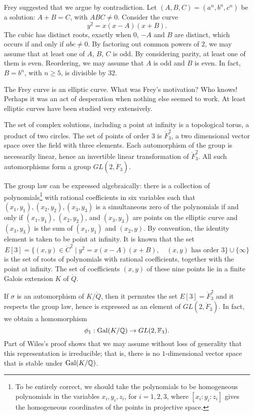 \documentclass{amsart}
\def\CC{\ring{C}}
\def\oG{\op{Gal}}
\begin{document}
Frey suggested that we argue by contradiction.  Let
$(A,B,C)=(a^n,b^n,c^n)$ be a solution: $A+B=C$, with $ABC\ne
0$. Consider the curve
\[
y^2 = x (x - A) (x + B).
\]
The cubic has distinct roots, exactly when $0$, $-A$ and $B$ are
distinct, which occurs if and only if $abc\ne 0$.  By factoring out
common powers of $2$, we may assume that at least one of $A$, $B$, $C$
is odd.  By considering parity, at least one of them is even.
Reordering, we may assume that $A$ is odd and $B$ is even.  In fact,
$B=b^n$, with $n\ge 5$, is divisible by $32$.


The Frey curve is an elliptic curve.  What was Frey's motivation?  Who
knows! Perhaps it was an act of desperation when nothing else seemed
to work. At least elliptic curves have been studied very extensively.

The set of complex solutions, including a point at infinity is a
topological torus, a product of two circles.  The set of points of
order $3$ is $\ring{F}_3^2$, a two dimensional vector space over the
field with three elements.  Each automorphism of the group is
necessarily linear, hence an invertible linear transformation of
$\ring{F}^2_3$.  All such automorphisms form a group
$GL(2,\ring{F}_3)$.

The group law can be expressed algebraically: there is a collection of
polynomials\footnote{To be entirely correct, we should take the
  polynomials to be homogeneous polynomials in the variables
  $x_i,y_i,z_i$, for $i=1,2,3$, where $[x_i:y_i:z_i]$ gives the
  homogeneous coordinates of the points in projective space.}  with
rational coefficients in six variables such that
$(x_1,y_1),(x_2,y_2),(x_3,y_3)$ is a simultaneous zero of the
polynomials if and only if $(x_1,y_1)$, $(x_2,y_2)$, and $(x_3,y_3)$
are points on the elliptic curve and $(x_3,y_3)$ is the sum of
$(x_1,y_1)$ and $(x_2,y)$.  By convention, the identity element is
taken to be point at infinity.  It is known that the set
\[
E[3]= \{(x,y) \in \CC^2\mid y^2 = x (x-A) (x+B), 
\quad (x,y) \text{ has order } 3\}\cup \{\infty\}
\]
is the set of roots of polynomials with rational coefficients,
together with the point at infinity.  The set of coefficients $(x,y)$
of these nine points lie in a finite Galois extension $K$ of
$\ring{Q}$.

If $\sigma$ is an automorphism of $K/\ring{Q}$, then it permutes the
set $E[3]=\ring{F}_3^2$ and it respects the group law, hence is
expressed as an element of $GL(2,\ring{F}_3)$.  In fact, we obtain a
homomorphism
\[
\phi_1 : \oG(K/\ring{Q}) \to GL(2,\ring{F}_3).
\]
Part of Wiles's proof shows that we may assume without loss of
generality that this representation is irreducible; that is, there is
no $1$-dimensional vector space that is stable under
$\oG(K/\ring{Q})$.
\end{document}
